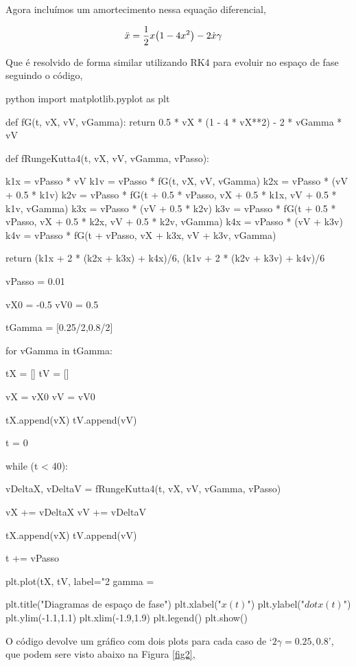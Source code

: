 \documentclass[twoside]{amsart}
\numberwithin{equation}{section}
\begin{document}
Agora incluímos um amortecimento nessa equação diferencial,

\begin{align}
    \ddot{x}&=\frac12x\qty(1-4x^2)-2\dot x\gamma
\end{align}

Que é resolvido de forma similar utilizando RK4 para evoluir no espaço de fase seguindo o código,

\begin{mintedbox}{python}
import matplotlib.pyplot as plt

def fG(t, vX, vV, vGamma):
    return 0.5 * vX * (1 - 4 * vX**2) - 2 * vGamma * vV

def fRungeKutta4(t, vX, vV, vGamma, vPasso):

    k1x = vPasso * vV
    k1v = vPasso * fG(t, vX, vV, vGamma)
    k2x = vPasso * (vV + 0.5 * k1v)
    k2v = vPasso * fG(t + 0.5 * vPasso, vX + 0.5 * k1x, vV + 0.5 * k1v, vGamma)
    k3x = vPasso * (vV + 0.5 * k2v)
    k3v = vPasso * fG(t + 0.5 * vPasso, vX + 0.5 * k2x, vV + 0.5 * k2v, vGamma)
    k4x = vPasso * (vV + k3v)
    k4v = vPasso * fG(t + vPasso, vX + k3x, vV + k3v, vGamma)

    return (k1x + 2 * (k2x + k3x) + k4x)/6, (k1v + 2 * (k2v + k3v) + k4v)/6

vPasso = 0.01

vX0 = -0.5
vV0 = 0.5

tGamma = [0.25/2,0.8/2]

for vGamma in tGamma:

    tX = []
    tV = []

    vX = vX0
    vV = vV0

    tX.append(vX)
    tV.append(vV)
    
    t = 0

    while (t < 40):

        vDeltaX, vDeltaV = fRungeKutta4(t, vX, vV, vGamma, vPasso)

        vX += vDeltaX
        vV += vDeltaV

        tX.append(vX)
        tV.append(vV)

        t += vPasso

    plt.plot(tX, tV, label="2 gamma = %

plt.title("Diagramas de espaço de fase")
plt.xlabel("$x(t)$")
plt.ylabel("$dot x(t)$")
plt.ylim(-1.1,1.1)
plt.xlim(-1.9,1.9)
plt.legend()
plt.show()
\end{mintedbox}

O código devolve um gráfico com dois plots para cada caso de `$2\gamma=0.25,0.8$', que podem sere visto abaixo na 
Figura \ref{fig2},
\end{document}
